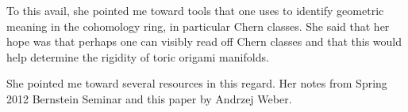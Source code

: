 \documentclass[12pt]{article}
\begin{document}
\hfill

To this avail, she pointed me toward tools that one uses to identify geometric meaning in the cohomology ring, in particular Chern classes. 
She said that her hope was that perhaps one can visibly read off Chern classes and that this would help determine the rigidity of toric origami manifolds.

\hfill

She pointed me toward several resources in this regard. Her notes from Spring 2012 Bernstein Seminar and this paper by Andrzej Weber.
\end{document}
